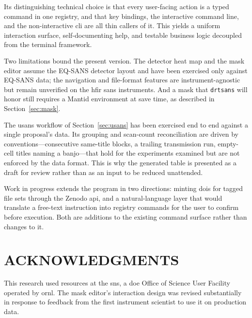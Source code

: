 \documentclass[tm]{ornltm}
\begin{document}
Its distinguishing technical choice is that every user-facing action is a typed
command in one registry, and that key bindings, the interactive command line, and
the non-interactive \ac{cli} are all thin callers of it. This yields a uniform
interaction surface, self-documenting help, and testable business logic decoupled
from the terminal framework.

Two limitations bound the present version. The detector heat map and the mask
editor assume the EQ-SANS detector layout and have been exercised only against
EQ-SANS data; the navigation and file-format features are instrument-agnostic
but remain unverified on the \ac{hfir} \ac{sans} instruments. And a mask that
\texttt{drtsans} will honor still requires a Mantid environment at save time, as
described in Section~\ref{sec:mask}.

The \ac{usans} workflow of Section~\ref{sec:usans} has been exercised end to end
against a single proposal's data. Its grouping and scan-count reconciliation are
driven by conventions---consecutive same-title blocks, a trailing transmission
run, empty-cell titles naming a banjo---that hold for the experiments examined
but are not enforced by the data format. This is why the generated table is
presented as a draft for review rather than as an input to be reduced
unattended.

Work in progress extends the program in two directions: minting \acp{doi} for
tagged file sets through the Zenodo \ac{api}, and a natural-language layer that
would translate a free-text instruction into registry commands for the user to
confirm before execution. Both are additions to the existing command surface
rather than changes to it.

\section*{ACKNOWLEDGMENTS}

This research used resources at the \ac{sns}, a \ac{doe} Office of Science User
Facility operated by \ac{ornl}. The mask editor's interaction design was revised
substantially in response to feedback from the first instrument scientist to use
it on production data.

\end{document}
